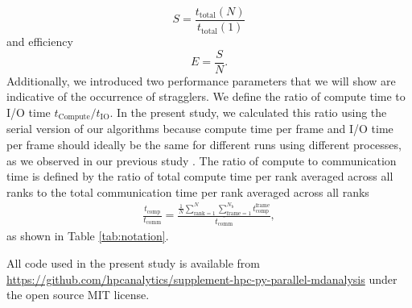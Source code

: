 \begin{equation}
  \label{eq:speedup}
  S = \frac{t_{\text{total}}(N)}{t_{\text{total}}(1)}
\end{equation}
and efficiency
\begin{equation}
  \label{eq:efficiency}
  E = \frac{S}{N}.
\end{equation}
Additionally, we introduced two performance parameters that we will show are indicative of the occurrence of stragglers.
We define the ratio of compute time to I/O time $t_{\text{Compute}}/t_{\text{IO}}$. 
In the present study, we calculated this ratio using the serial version of our algorithms because compute time per frame and I/O time per frame should ideally be the same for different runs using different processes, as we observed in our previous study \cite{Khoshlessan:2017ab}.
The ratio of compute to communication time is defined by the ratio of total compute time per rank averaged across all ranks to the total communication time per rank averaged across all ranks 
\begin{gather}
  \label{eq:Compute-comm}
  \frac{t_{\text{comp}}}{t_{\text{comm}}} = \frac{\frac{1}{N}
    \sum_{\text{rank}=1}^{N} \sum_{\text{frame}=1}^{N_{\text{b}}}t_{\text{comp}}^{\text{frame}}}%
  {\overline{t_{\text{comm}}}},
\end{gather}
as shown in Table \ref{tab:notation}.
 
All code used in the present study is available from \url{https://github.com/hpcanalytics/supplement-hpc-py-parallel-mdanalysis} under the open source MIT license. 
 
